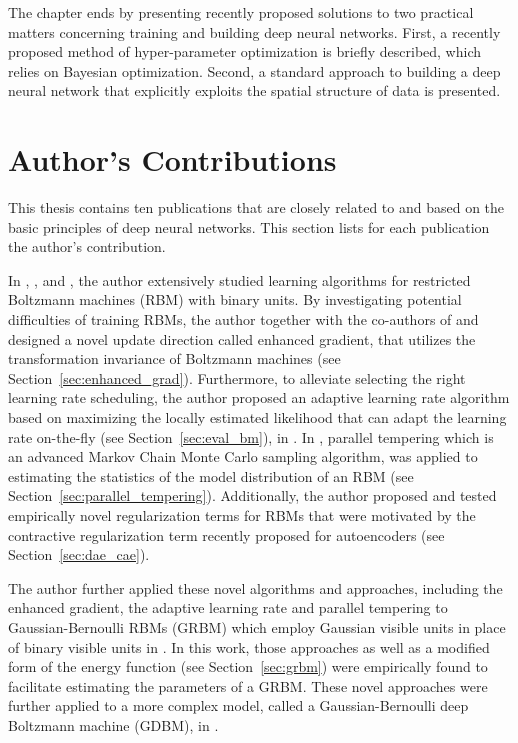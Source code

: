 \documentclass[dissertation,nocontribution]{aaltoseries}
\begin{document}
The chapter ends by presenting recently proposed solutions
to two practical matters concerning training and building
deep neural networks. First, a recently proposed method of
hyper-parameter optimization is briefly described, which
relies on Bayesian optimization. Second, a standard approach
to building a deep neural network that explicitly exploits
the spatial structure of data is presented.

\section{Author's Contributions}
\label{sec:contrib}

This thesis contains ten publications that are closely
related to and based on the basic principles of deep neural
networks.  This section lists for each publication the
author's contribution.

In \textbf{},
\textbf{},
\textbf{} and
\textbf{}, the
author extensively studied learning algorithms for
restricted Boltzmann machines (RBM) with binary units. By
investigating potential difficulties of training RBMs, the
author together with the co-authors of
and  designed a novel update
direction called enhanced gradient, that utilizes the
transformation invariance of Boltzmann machines (see
Section~\ref{sec:enhanced_grad}). Furthermore, to alleviate
selecting the right learning rate scheduling, the author
proposed an adaptive learning rate algorithm based on
maximizing the locally estimated likelihood that can adapt the learning
rate on-the-fly (see Section~\ref{sec:eval_bm}), in
. In
, parallel
tempering which is an advanced Markov Chain Monte Carlo
sampling algorithm, was applied to estimating the statistics
of the model distribution of an RBM (see
Section~\ref{sec:parallel_tempering}). Additionally, the
author proposed and tested empirically novel regularization
terms for RBMs that were motivated by the 
contractive regularization term recently proposed for autoencoders (see
Section~\ref{sec:dae_cae}).

The author further applied these novel algorithms and
approaches, including the enhanced gradient, the adaptive
learning rate and parallel tempering to Gaussian-Bernoulli
RBMs (GRBM) which employ Gaussian visible units in place of
binary visible units in \textbf{}. In this
work, those approaches as well as a modified form of the
energy function (see Section~\ref{sec:grbm}) were
empirically found to facilitate estimating the parameters of
a GRBM.  These novel approaches were further applied to a
more complex model, called a Gaussian-Bernoulli deep
Boltzmann machine (GDBM), in \textbf{}.
\end{document}
